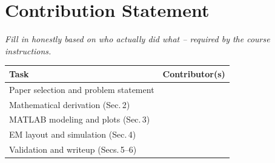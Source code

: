 \documentclass[11pt]{article}
\begin{document}
\section*{Contribution Statement}
\textit{Fill in honestly based on who actually did what -- required by the course
instructions.}
\begin{table}[h]
\centering
\begin{tabular}{@{}lp{7cm}@{}}
\toprule
\textbf{Task} & \textbf{Contributor(s)} \\
\midrule
Paper selection and problem statement & \\[4pt]
Mathematical derivation (Sec.\,2) & \\[4pt]
MATLAB modeling and plots (Sec.\,3) & \\[4pt]
EM layout and simulation (Sec.\,4) & \\[4pt]
Validation and writeup (Secs.\,5--6) & \\[4pt]
\bottomrule
\end{tabular}
\end{table}
\end{document}
